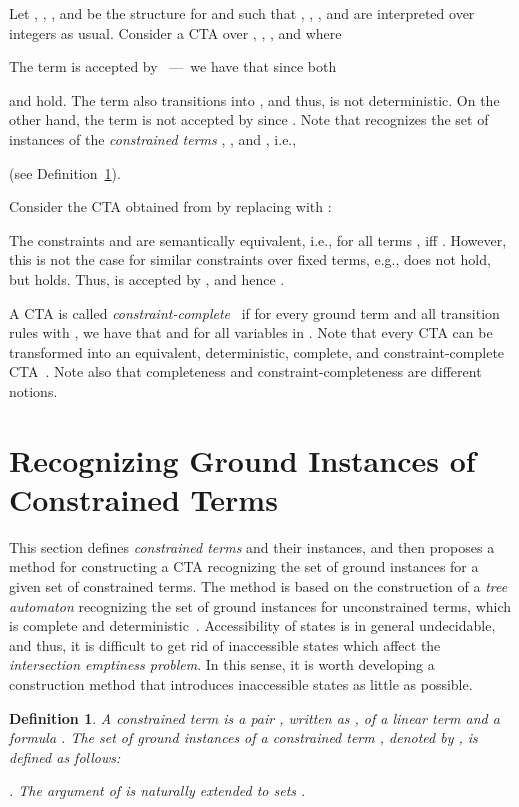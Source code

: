 \documentclass[copyright,creativecommons]{eptcs}
\newtheorem{definition}{Definition}
\begin{document}
\begin{example}\label{ex:CTA}
Let   ,  
 ,   , and  be the structure
  for  and  such that   , 
  ,   , and
  are interpreted over integers as usual.
 Consider a CTA   
 over , , , and  where 
 
 The term
  is accepted
 by ~---~we have that
   since both 
 
 
 
 and  hold.
 The term 
 also transitions into , and thus,  is not
 deterministic. 
 On the other hand, the term
  is not accepted by
  since
 . 
 Note that  recognizes the set of instances of the
 \emph{constrained terms} ,
 , and 
 ,  
i.e.,  
   
  (see
 Definition~\ref{def:constrained-term}).

 Consider the CTA    obtained from 
  by replacing 
 with :
 
 The constraints  and  are 
 semantically equivalent, i.e., for all terms  
 , 
 iff . 
 However, this is not the case for similar constraints over fixed terms,
 e.g.,  does not hold, but
  holds.
 Thus,  is accepted by
 , and hence   . 
\end{example}

A CTA    is called
\emph{constraint-complete}~\cite{CTA} if for every ground term  
 and all transition rules 
   with  
  , 
we have that    and   
for all variables  in .
Note that every CTA can be transformed into an equivalent,
deterministic, complete, and constraint-complete CTA~\cite{CTA}. 
Note also that completeness and constraint-completeness are different notions. 

\section{Recognizing Ground Instances of Constrained Terms}
\label{sec:construction}

This section defines \emph{constrained terms} and their instances,
and then proposes a method for constructing a CTA recognizing the set of
ground instances for a given set of constrained terms. 
The method is based on the construction of a \emph{tree automaton}
recognizing the set of ground instances for unconstrained terms, which
is complete and deterministic~\cite[Exercise~1.9]{TATA}.
Accessibility of states is in general undecidable, and thus, it is
difficult to get rid of inaccessible states which affect
the \emph{intersection emptiness problem}. 
In this sense, it is worth developing a construction method that
introduces inaccessible states as little as possible. 
\begin{definition}\label{def:constrained-term}
A \emph{constrained term} is a pair , written as
, of a linear term  
   and a formula  
 . 
The set of \emph{ground instances} of a constrained term 
, denoted by , is defined
 as follows:
 
.
The argument of  is naturally extended to sets 
. \end{definition}
\end{document}
